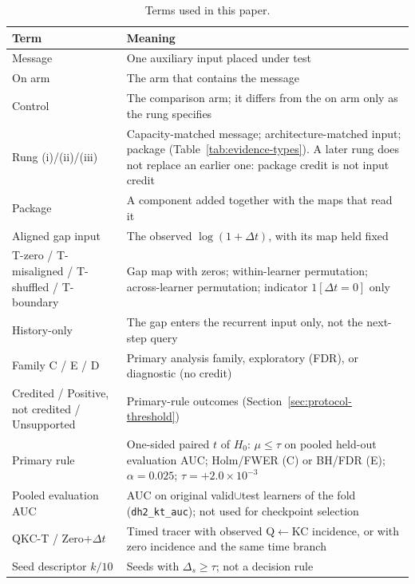 \begin{table}[H]
\caption{Terms used in this paper.}
\label{tab:terms}
\centering
\footnotesize
\begin{tabularx}{\textwidth}{@{}>{\raggedright\arraybackslash}p{3.3cm}X@{}}
\toprule
Term & Meaning \\
\midrule
Message & One auxiliary input placed under test \\
On arm & The arm that contains the message \\
Control & The comparison arm; it differs from the on arm only as the rung specifies \\
Rung (i)/(ii)/(iii) & Capacity-matched message; architecture-matched input; package
(Table~\ref{tab:evidence-types}). A later rung does not replace an earlier one:
package credit is not input credit \\
Package & A component added together with the maps that read it \\
Aligned gap input & The observed $\log(1{+}\Delta t)$, with its map held fixed \\
T-zero / T-misaligned / T-shuffled / T-boundary & Gap map with zeros; within-learner
permutation; across-learner permutation; indicator $1[\Delta t{=}0]$ only \\
History-only & The gap enters the recurrent input only, not the next-step query \\
Family C / E / D & Primary analysis family, exploratory (FDR), or diagnostic (no credit) \\
Credited / Positive, not credited / Unsupported & Primary-rule outcomes
(Section~\ref{sec:protocol-threshold}) \\
Primary rule & One-sided paired $t$ of $H_0{:}\,\mu\le\tau$ on pooled held-out
evaluation AUC; Holm/FWER (C) or BH/FDR (E); $\alpha{=}0.025$;
$\tau{=}{+}2.0\times 10^{-3}$ \\
Pooled evaluation AUC & AUC on original valid$\cup$test learners of the fold
(\texttt{dh2\_kt\_auc}); not used for checkpoint selection \\
QKC-T / Zero$+\Delta t$ & Timed tracer with observed Q$\leftarrow$KC incidence, or
with zero incidence and the same time branch \\
Seed descriptor $k/10$ & Seeds with $\Delta_s\ge\tau$; not a decision rule \\
\bottomrule
\end{tabularx}
\end{table}
